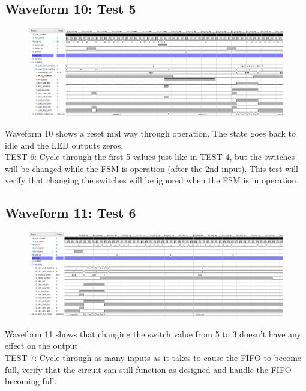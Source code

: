 \documentclass[11pt]{report}
\begin{document}
\subsection*{Waveform 10: Test 5 }
\begin{figure}[H]
       \includegraphics[width=\columnwidth]{Assets/Test5.png}
\end{figure}

Waveform 10 shows a reset mid way through operation. The state goes back to idle and the LED outputs zeros.\\

TEST 6: Cycle through the first 5 values just like in TEST 4, but the switches will be changed while the FSM is operation
(after the 2nd input). This test will verify that changing the switches will be ignored when the FSM is in operation.

\subsection*{Waveform 11: Test 6 }
\begin{figure}[H]
       \includegraphics[width=\columnwidth]{Assets/Test6.png}
\end{figure}

Waveform 11 shows that changing the switch value from 5 to 3 doesn't have any effect on the output\\

TEST 7: Cycle through as many inputs as it takes to cause the FIFO to become full, verify that the circuit can still function
as designed and handle the FIFO becoming full.
\end{document}
